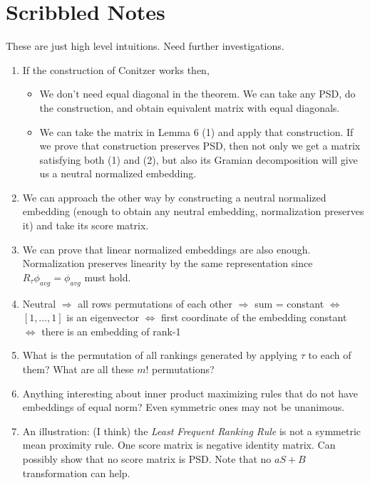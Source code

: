 \documentclass[10pt,letterpaper]{article}
\begin{document}
\section{Scribbled Notes}
These are just high level intuitions. Need further investigations.
\begin{enumerate}
\item If the construction of Conitzer works then,
\begin{itemize}
\item We don't need equal diagonal in the theorem. We can take any PSD, do the construction, and obtain equivalent matrix with equal diagonals.
\item We can take the matrix in Lemma 6 (1) and apply that construction. If we prove that construction preserves PSD, then not only we get a matrix satisfying both (1) and (2), but also its Gramian decomposition will give us a neutral normalized embedding. 
\end{itemize}
\item We can approach the other way by constructing a neutral normalized embedding (enough to obtain any neutral embedding, normalization preserves it) and take its score matrix. 

\item We can prove that linear normalized embeddings are also enough. Normalization preserves linearity by the same representation since $R_{\tau} \phi_{avg} = \phi_{avg}$ must hold.

\item Neutral $\Rightarrow$ all rows permutations of each other $\Rightarrow$ sum = constant $\Leftrightarrow$ $[1,\ldots,1]$ is an eigenvector $\Leftrightarrow$ first coordinate of the embedding constant $\Leftrightarrow$ there is an embedding of rank-1

\item What is the permutation of all rankings generated by applying $\tau$ to each of them? What are all these $m!$ permutations?

\item Anything interesting about inner product maximizing rules that do not have embeddings of equal norm? Even symmetric ones may not be unanimous. 

\item An illustration: (I think) the \emph{Least Frequent Ranking Rule} is not a symmetric mean proximity rule. One score matrix is negative identity matrix. Can possibly show that no score matrix is PSD. Note that no $aS+B$ transformation can help.
\end{enumerate}
\end{document}

